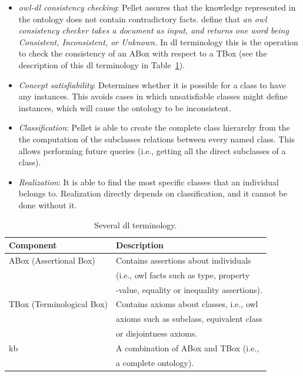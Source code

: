 \begin{itemize}
  \item \textit{\ac{owl}-\ac{dl} consistency checking}: Pellet assures that the 
  knowledge represented in the ontology does not contain contradictory facts. 
  \citet{carroll_owl_2004} define that \textit{an \ac{owl} consistency checker 
  takes a document as input, and returns one word being Consistent, Inconsistent, 
  or Unknown.} In \ac{dl} terminology  this is the operation to check the 
  consistency of an ABox with respect to a TBox (see the description of this 
  \ac{dl} terminology in Table~\ref{tbl:dl_terms}).
  
  \item \textit{Concept satisfiability}: Determines whether it is possible for 
  a class to have any instances. This avoids cases in which unsatisfiable classes 
  might define instances, which will cause the ontology to be inconsistent.
  
  \item \textit{Classification}: Pellet is able to create the complete class 
  hierarchy from the the computation of the subclasses relations between every 
  named class. This allows performing future queries (i.e., getting all the 
  direct subclasses of a class).
  
  \item \textit{Realization}: It is able to find the most specific classes that 
  an individual belongs to. Realization directly depends on classification, and 
  it cannot be done without it.
\end{itemize}


\begin{table}[H]
  \caption{Several \ac{dl} terminology.}
 \label{tbl:dl_terms}
\footnotesize
\centering
 \begin{tabular}{l l}
  \hline 
  \textbf{Component} 		& \textbf{Description}				\\
  \hline
  ABox (Assertional Box)	& Contains assertions about individuals	\\
				& (i.e., \ac{owl} facts such  as type, property	\\
				& -value, equality or inequality assertions).	\\
  TBox (Terminological Box)	& Contains axioms about classes, i.e., \ac{owl}	\\
				& axioms such as subclass, equivalent class 	\\
				& or disjointness axioms.			\\
  \acl{kb}			& A combination of ABox and TBox (i.e.,		\\
				& a complete ontology).				\\
  \hline
  
\end{tabular}
\end{table}

